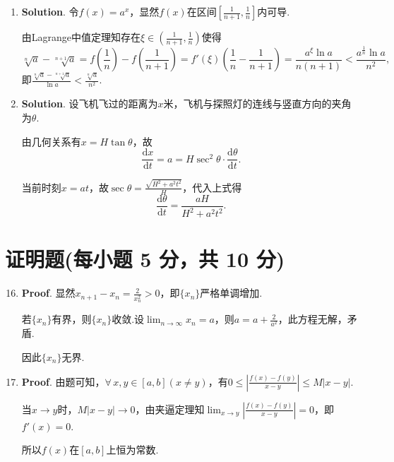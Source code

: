 \documentclass[../main.tex]{subfiles}
\begin{document}
\begin{enumerate}
          因此$f'(x)$在$\mathbf{R}$上处处连续.

    \item \textbf{Solution}. 令$f(x)=a^{x}$，显然$f(x)$在区间$\left[\frac{1}{n+1}
                  ,\frac{1}{n}\right]$内可导.

          由Lagrange中值定理知存在$\xi\in\left(\frac{1}{n+1},\frac{1}{n}\right)$使得
          \[
              \sqrt[n]{a}-\sqrt[n+1]{a}=f\left(\frac{1}{n}\right)-f\left(\frac{1}{n+1}\right
              )=f'(\xi)\left(\frac{1}{n}-\frac{1}{n+1}\right)=\frac{a^{\xi}\ln a}{n(n+1)}
              <\frac{a^{\frac{1}{n}}\ln a}{n^{2}},
          \]
          即$\frac{\sqrt[n]{a}-\sqrt[n+1]{a}}{\ln a}<\frac{\sqrt[n]{a}}{n^{2}}$.

    \item \textbf{Solution}. 设飞机飞过的距离为$x$米，飞机与探照灯的连线与竖直方向的夹角为$\theta$.

          由几何关系有$x=H\tan\theta$，故
          \[
              \frac{\mathrm{d}x}{\mathrm{d}t}=a=H\sec^{2}\theta\cdot \frac{\mathrm{d}\theta}{\mathrm{d}t}
              .
          \]

          当前时刻$x=at$，故$\sec\theta=\frac{\sqrt{H^{2}+a^{2}t^{2}}}{H}$，代入上式得
          \[
              \frac{\mathrm{d}\theta}{\mathrm{d}t}=\frac{aH}{H^{2}+a^{2}t^{2}}.
          \]
\end{enumerate}

\section{证明题(每小题 5 分，共 10 分)}
\begin{enumerate}
    \setcounter{enumi}{15}
    \item \textbf{Proof}. 显然$x_{n+1}-x_{n}=\frac{2}{x_{n}^{2}}>0$，即$\{x_{n}\}$严格单调增加.

          若$\{x_{n}\}$有界，则$\{x_{n}\}$收敛.设$\lim_{n\to\infty}x_{n}=a$，则$a=a+\frac{2}{a^{2}}$，此方程无解，矛盾.

          因此$\{x_{n}\}$无界.

    \item \textbf{Proof}. 由题可知，$\forall\,x,y\in[a,b](x\neq y)$，有$0\leq
              \left|\frac{f(x)-f(y)}{x-y}\right|\leq M|x-y|$.

          当$x\to y$时，$M|x-y|\to0$，由夹逼定理知$\lim_{x\to y}\left|\frac{f(x)-f(y)}{x-y}
              \right|=0$，即$f'(x)=0$.

          所以$f(x)$在$[a,b]$上恒为常数.
\end{enumerate}
\end{document}
